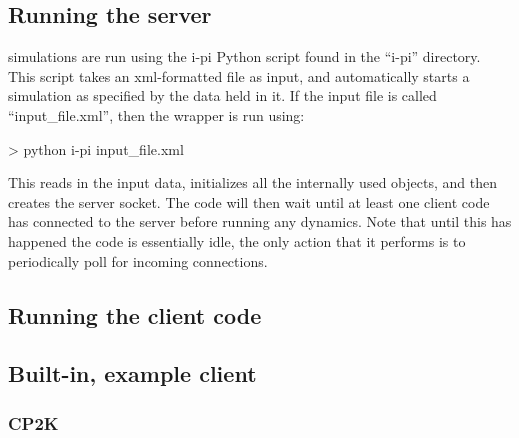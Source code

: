 \documentclass[11pt,english,fleqn]{report}
\newenvironment{code}{%
\footnotesize 
\verbatim
}{
\endverbatim
\normalsize
}
\begin{document}
\subsection{Running the \ipi server}

\label{runningsimulations}

\ipi simulations are run using the i-pi Python script found in the
{}``i-pi'' directory. This script takes an xml-formatted file as
input, and automatically starts a simulation as specified by the data
held in it. If the input file is called {}``input\_file.xml'', then
the wrapper is run using:

\begin{code}
> python i-pi input_file.xml
\end{code}

This reads in the input data, initializes all the internally used
objects, and then creates the server socket. The code will then wait
until at least one client code has connected to the server before
running any dynamics. Note that until this has happened the code is
essentially idle, the only action that it performs is to periodically
poll for incoming connections.


\subsection{Running the client code}

\label{runningclients}

\subsection{Built-in, example client}

\label{driver.x}

\subsubsection{CP2K}


\end{document}
